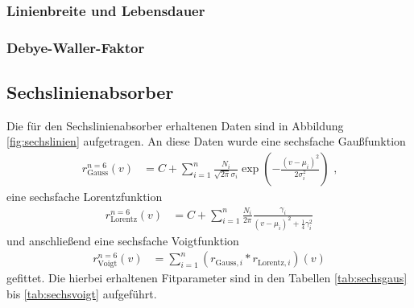 \subsubsection{Linienbreite und Lebensdauer}
\subsubsection{Debye-Waller-Faktor}



\subsection{Sechslinienabsorber}

Die für den Sechslinienabsorber erhaltenen Daten sind in Abbildung \ref{fig:sechslinien} aufgetragen. An diese Daten wurde eine sechsfache Gaußfunktion
\begin{align}
r_\mathrm{Gauss}^{n=6}(v)&=C+\sum_{i=1}^n\frac{N_i}{\sqrt{2\pi}\sigma_i}\exp(-\frac{(v-\mu_i)^2}{2\sigma_i^2})\text{ ,}\label{eq:sechsgaus}
\end{align}
eine sechsfache Lorentzfunktion 
\begin{align}
r_\mathrm{Lorentz}^{n=6}(v)&=C+\sum_{i=1}^n\frac{N_i}{2\pi}\frac{\gamma_i}{\left(v-\mu_i\right)^2+\frac14\gamma_i^2}\label{eq:sechslorentz}
\end{align}
und anschließend eine sechsfache Voigtfunktion 
\begin{align}
r_\mathrm{Voigt}^{n=6}(v)&=\sum_{i=1}^n\left(r_{\mathrm{Gauss}, i}*r_{\mathrm{Lorentz}, i}\right)(v)\label{eq:sechsvoigt}
\end{align}
gefittet. Die hierbei erhaltenen Fitparameter sind in den Tabellen \ref{tab:sechsgaus} bis \ref{tab:sechsvoigt} aufgeführt.

